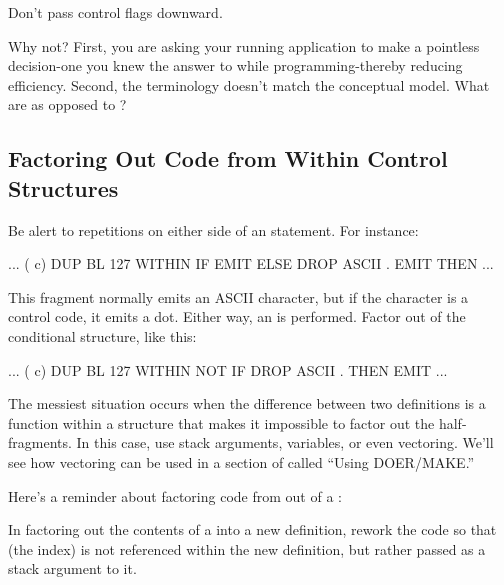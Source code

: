 \begin{tip}
Don't pass control flags downward.
\end{tip}
Why not? First, you are asking your running application to make a
pointless decision-one you knew the answer to while
programming-thereby reducing efficiency. Second, the terminology
doesn't match the conceptual model. What are 
as opposed to ?

\subsection{Factoring Out Code from Within Control Structures}

Be alert to repetitions on either side of an 
statement. For instance:

\begin{Code}
... ( c)  DUP  BL 127 WITHIN
       IF  EMIT  ELSE
       DROP  ASCII . EMIT   THEN ...
\end{Code}
This fragment normally emits an ASCII character, but if the character
is a control code, it emits a dot. Either way, an  is
performed. Factor  out of the conditional structure, like
this:

\begin{Code}
... ( c)  DUP  BL 127 WITHIN NOT
       IF  DROP  ASCII .  THEN  EMIT  ...
\end{Code}
The messiest situation occurs when the difference between two
definitions is a function within a structure that makes it impossible
to factor out the half-fragments. In this case, use stack arguments,
variables, or even vectoring. We'll see how vectoring can be used in a
section of  called ``Using DOER/MAKE.''

Here's a reminder about factoring code from out of a :

\begin{tip}
In factoring out the contents of a  into a new
definition, rework the code so that  (the index) is not
referenced within the new definition, but rather passed as a stack
argument to it.
\end{tip}

